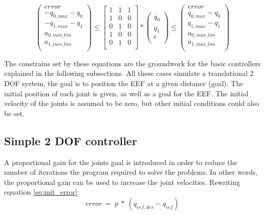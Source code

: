 $\ $ \\
\begin{equation}
\left( \begin{array}{c}
error \\
-q_{0,max} - q_{0} \\
-q_{1,max} - q_{1} \\
a_{0,min\_lim} \\
a_{1,min\_lim} \\
\end{array}
\right)	\leq 
\left[ \begin{array}{cccc}
1 & 1 & 1 \\
1 & 0 & 0 \\
0 & 1 & 0 \\
1 & 0 & 0 \\
0 & 1 & 0 \\
\end{array}
\right] *
\left( \begin{array}{c}
\dot{q}_{0} \\
\dot{q}_{1} \\
\epsilon \\
\end{array}
\right) 
\leq \left( \begin{array}{c}
error \\
q_{0,max} - q_{0} \\
q_{1,max} - q_{1} \\
a_{0,max\_lim} \\
a_{1,max\_lim} \\
\end{array}
\right)
\label{eq:a_constr}
\end{equation}

The constrains set by these equations are the groundwork for the basic controllers explained in the following subsections. All these cases simulate a translational 2 DOF system, the goal is to position the EEF at a given distance (goal). The initial position of each joint is given, as well as a goal for the EEF. The initial velocity of the joints is assumed to be zero, but other initial conditions could also be set.

\subsection{Simple 2 DOF controller}
A proportional gain for the joints goal is introduced in order to reduce the number of iterations the program required to solve the problems. In other words, the proportional gain can be used to increase the joint velocities. Rewriting equation \ref{eq:init_error}:
\begin{equation}
error\ =\ p\ *\ \left(q_{eef,des} - q_{eef}\right)
\end{equation}


